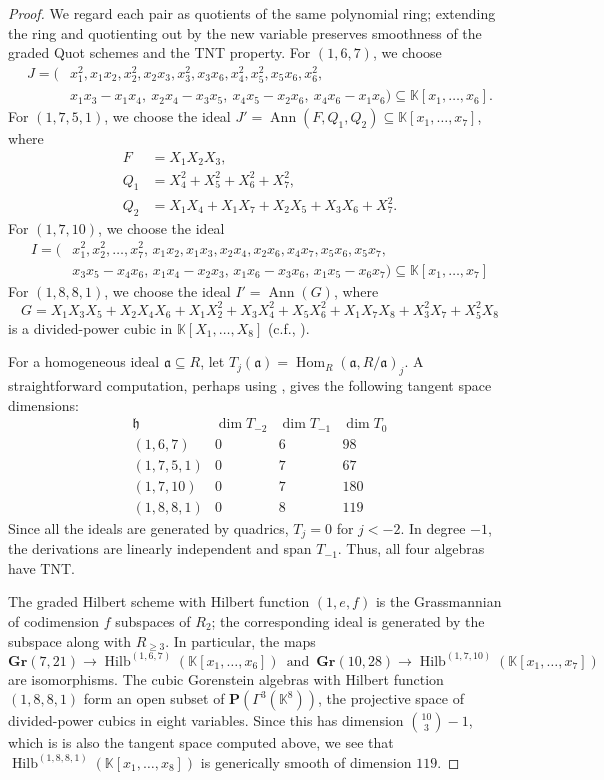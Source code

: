 \documentclass[leqno,11pt,a4paper]{amsart}
\theoremstyle{definition}
\numberwithin{equation}{section}
\newcommand{\Gr}{\mathbf{Gr}}
\newcommand{\kk}{\mathbb{K}}
\newcommand{\PP}{\mathbf{P}}
\newcommand{\mfh}{\mathfrak{h}}
\DeclareMathOperator{\Hom}{Hom}
\DeclareMathOperator{\Hilb}{Hilb}
\DeclareMathOperator{\Ann}{Ann}
\begin{document}
\begin{proof}
We regard each pair as quotients of the same polynomial ring; extending the ring and quotienting out by the new variable preserves smoothness of the graded Quot schemes and the TNT property.
For $(1,6,7)$, we choose
$$
\begin{aligned}
J=\big(&x_1^2,x_1x_2,x_2^2,x_2x_3,x_3^2,x_3x_6,
        x_4^2,x_5^2,x_5x_6,x_6^2,\\
       &x_1x_3-x_1x_4,\ x_2x_4-x_3x_5,
        \ x_4x_5-x_2x_6,\ x_4x_6-x_1x_6\big)
        \subseteq\kk[x_1,\ldots,x_6].
\end{aligned}
$$
For $(1,7,5,1)$, we choose the ideal
$J'=\Ann(F,Q_1,Q_2)\subseteq\kk[x_1,\ldots,x_7]$,
where
$$
\begin{aligned}
F&=X_1X_2X_3,\\
Q_1&=X_4^2+X_5^2+X_6^2+X_7^2,\\
Q_2&=X_1X_4+X_1X_7+X_2X_5+X_3X_6+X_7^2.
\end{aligned}
$$
For $(1,7,10)$, we choose the ideal 
$$
\begin{aligned}
I=\big(&x_1^2,x_2^2,\ldots,x_7^2,\,
x_1x_2,x_1x_3,x_2x_4,x_2x_6,x_4x_7,x_5x_6,x_5x_7,\\
&x_3x_5-x_4x_6,\,
x_1x_4-x_2x_3,\,
x_1x_6-x_3x_6,\,
x_1x_5-x_6x_7\big) \subseteq \kk[x_1,\ldots,x_7]
\end{aligned}
$$
For $(1,8,8,1)$, we choose the ideal $I'=\Ann(G)$, where
$$
G=X_1X_3X_5+X_2X_4X_6+X_1X_2^2+X_3X_4^2
+X_5X_6^2+X_1X_7X_8+X_3^2X_7+X_5^2X_8
$$
is a divided-power cubic in $\kk[X_1,\dots,X_8]$ (c.f., \cite[Section 4]{Szafarczyk}).

For a homogeneous ideal $\mathfrak{a} \subseteq R$, let $T_j(\mathfrak{a})=\Hom_R(\mathfrak{a},R/\mathfrak{a})_j$. 
A straightforward computation, perhaps using \cite{M2}, gives the following tangent space dimensions:
$$
\begin{array}{c|ccc}
\text{$\mfh$}&\dim T_{-2}&\dim T_{-1}&\dim T_0\\ \hline
(1,6,7)&0&6&98\\
(1,7,5,1)&0&7&67\\
(1,7,10)&0&7&180\\
(1,8,8,1)&0&8&119
\end{array}
$$
Since all the ideals are generated by quadrics, $T_j=0$ for $j<-2$.
In degree $-1$, the derivations are linearly independent and span $T_{-1}$.
Thus, all four algebras have TNT. 

The graded Hilbert scheme with Hilbert function $(1,e,f)$ is the Grassmannian of codimension $f$ subspaces of $R_2$; the corresponding ideal is generated by the subspace along with $R_{\geq 3}$. 
In particular, the maps 
$$
\Gr(7,21) \to \Hilb^{(1,6,7)}(\kk[x_1,\dots,x_6]) \, \text{ and } \, 
\Gr(10,28) \to \Hilb^{(1,7,10)}(\kk[x_1,\dots,x_7])
$$ 
are isomorphisms.
The cubic Gorenstein algebras with Hilbert function $(1,8,8,1)$ form
an open subset of $\PP(\Gamma^3(\kk^8))$, the projective space of divided-power cubics in
eight variables. Since this has dimension $\binom{10}{3}-1$, which is is also the tangent space computed above, we see that $\Hilb^{(1,8,8,1)}(\kk[x_1,\dots,x_8])$ is generically smooth of dimension $119$.



\end{proof}
\end{document}
